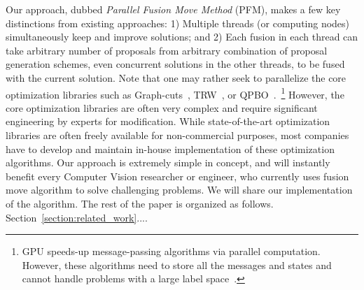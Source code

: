Our approach, dubbed {\it Parallel Fusion Move Method} (PFM), makes a
few key distinctions from existing approaches: 1) Multiple threads (or
computing nodes) simultaneously keep and improve solutions; and 2) Each
fusion in each thread can take arbitrary number of proposals from
arbitrary combination of proposal generation schemes, even concurrent
solutions in the other threads, to be fused with the current solution.
%
Note that one may rather seek to parallelize the core optimization
libraries such as Graph-cuts~\cite{}, TRW~\cite{kolmogorov}, or
QPBO~\cite{}.~\footnote{GPU speeds-up message-passing algorithms via
parallel computation. However, these algorithms need to store all the
messages and states and cannot handle problems with a large label space~\cite{layered_depthmap}.} However, the core optimization libraries are often
very complex and require significant engineering by experts for
modification.
%
While state-of-the-art optimization libraries are often freely available for
non-commercial purposes, most companies have to develop and maintain
in-house implementation of these optimization algorithms.
%
%
Our approach is extremely simple in concept, and will instantly benefit
every Computer Vision researcher or engineer, who currently uses fusion
move algorithm to solve challenging problems. We will share our
implementation of the algorithm. The rest of the paper is organized as
follows. Section~\ref{section:related_work}....


%



%



%


